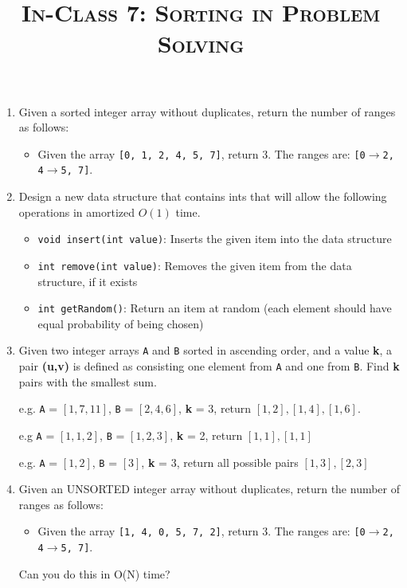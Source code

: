 \documentclass{article}
\title{\large{\textsc{In-Class 7: Sorting in Problem Solving}}}
\date{}
\begin{document}
\maketitle

\begin{enumerate}


\item Given a sorted integer array without duplicates, return the number of ranges as follows:

\begin{itemize}
    \item Given the array \texttt{[0, 1, 2, 4, 5, 7]}, return 3. The ranges are: \texttt{[0$\rightarrow$2, 4$\rightarrow$5, 7]}.
\end{itemize}

\item Design a new data structure that contains ints that will allow the following operations in amortized $O(1)$ time.
\begin{itemize}
    \item \texttt{void insert(int value)}: Inserts the given item into the data structure
    \item \texttt{int remove(int value)}: Removes the given item from the data structure, if it exists
    \item \texttt{int getRandom()}: Return an item at random (each element should have equal probability of being chosen)
\end{itemize}

\item Given two integer arrays \texttt{A} and \texttt{B} sorted in ascending order, and a value \textbf{k}, a pair \textbf{(u,v)} is defined as consisting one element from \texttt{A} and one from \texttt{B}. Find \textbf{k} pairs with the smallest sum.

e.g. \texttt{A} = $[1,7,11]$, \texttt{B} = $[2,4,6]$, \textbf{k} = 3, return $[1,2], [1,4], [1,6]$.

e.g \texttt{A} = $[1,1,2]$, \texttt{B} = $[1,2,3]$, \textbf{k} = 2, return $[1,1], [1,1]$

e.g. \texttt{A} = $[1,2]$, \texttt{B} = $[3]$, \textbf{k} = 3, return all possible pairs $[1,3], [2,3]$

\item Given an UNSORTED integer array without duplicates, return the number of ranges as follows:

\begin{itemize}
    \item Given the array \texttt{[1, 4, 0, 5, 7, 2]}, return 3. The ranges are: \texttt{[0$\rightarrow$2, 4$\rightarrow$5, 7]}.
\end{itemize}
Can you do this in O(N) time?
\end{enumerate}
\end{document}

